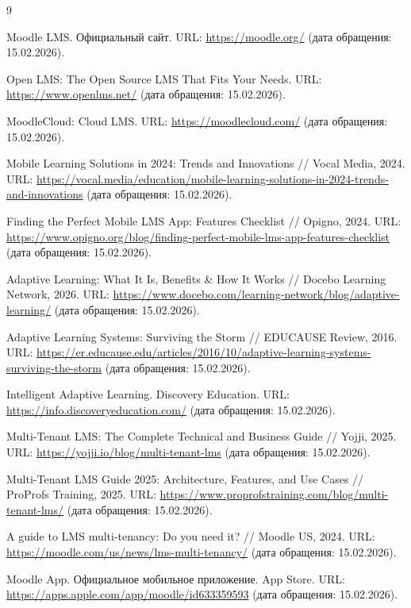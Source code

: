 \documentclass{G7-32}
\begin{document}

\begin{thebibliography}{9}

Moodle LMS. Официальный сайт. URL: \url{https://moodle.org/} (дата обращения: 15.02.2026).

Open LMS: The Open Source LMS That Fits Your Needs. URL: \url{https://www.openlms.net/} (дата обращения: 15.02.2026).

MoodleCloud: Cloud LMS. URL: \url{https://moodlecloud.com/} (дата обращения: 15.02.2026).

Mobile Learning Solutions in 2024: Trends and Innovations // Vocal Media, 2024. URL: \url{https://vocal.media/education/mobile-learning-solutions-in-2024-trends-and-innovations} (дата обращения: 15.02.2026).

Finding the Perfect Mobile LMS App: Features Checklist // Opigno, 2024. URL: \url{https://www.opigno.org/blog/finding-perfect-mobile-lms-app-features-checklist} (дата обращения: 15.02.2026).

Adaptive Learning: What It Is, Benefits \& How It Works // Docebo Learning Network, 2026. URL: \url{https://www.docebo.com/learning-network/blog/adaptive-learning/} (дата обращения: 15.02.2026).

Adaptive Learning Systems: Surviving the Storm // EDUCAUSE Review, 2016. URL: \url{https://er.educause.edu/articles/2016/10/adaptive-learning-systems-surviving-the-storm} (дата обращения: 15.02.2026).

Intelligent Adaptive Learning. Discovery Education. URL: \url{https://info.discoveryeducation.com/} (дата обращения: 15.02.2026).

Multi-Tenant LMS: The Complete Technical and Business Guide // Yojji, 2025. URL: \url{https://yojji.io/blog/multi-tenant-lms} (дата обращения: 15.02.2026).

Multi-Tenant LMS Guide 2025: Architecture, Features, and Use Cases // ProProfs Training, 2025. URL: \url{https://www.proprofstraining.com/blog/multi-tenant-lms/} (дата обращения: 15.02.2026).

A guide to LMS multi-tenancy: Do you need it? // Moodle US, 2024. URL: \url{https://moodle.com/us/news/lms-multi-tenancy/} (дата обращения: 15.02.2026).

Moodle App. Официальное мобильное приложение. App Store. URL: \url{https://apps.apple.com/app/moodle/id633359593} (дата обращения: 15.02.2026).

\end{thebibliography}
\end{document}
